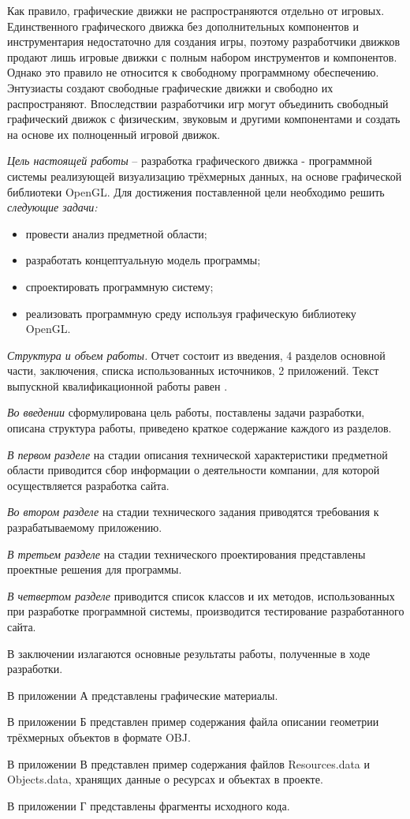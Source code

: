 Как правило, графические движки не распространяются отдельно от игровых. Единственного графического движка без дополнительных компонентов и инструментария недостаточно для создания игры, поэтому разработчики движков продают лишь игровые движки с полным набором инструментов и компонентов. Однако это правило не относится к свободному программному обеспечению. Энтузиасты создают свободные графические движки и свободно их распространяют. Впоследствии разработчики игр могут объединить свободный графический движок с физическим, звуковым и другими компонентами и создать на основе их полноценный игровой движок.

\emph{Цель настоящей работы} – разработка графического движка - программной системы реализующей визуализацию трёхмерных данных, на основе графической библиотеки OpenGL. Для достижения поставленной цели необходимо решить \emph{следующие задачи:}
\begin{itemize}
\item провести анализ предметной области;
\item разработать концептуальную модель программы;
\item спроектировать программную систему;
\item реализовать программную среду используя графическую библиотеку OpenGL.
\end{itemize}

\emph{Структура и объем работы.} Отчет состоит из введения, 4 разделов основной части, заключения, списка использованных источников, 2 приложений. Текст выпускной квалификационной работы равен .

\emph{Во введении} сформулирована цель работы, поставлены задачи разработки, описана структура работы, приведено краткое содержание каждого из разделов.

\emph{В первом разделе} на стадии описания технической характеристики предметной области приводится сбор информации о деятельности компании, для которой осуществляется разработка сайта.

\emph{Во втором разделе} на стадии технического задания приводятся требования к разрабатываемому приложению.

\emph{В третьем разделе} на стадии технического проектирования представлены проектные решения для программы.

\emph{В четвертом разделе} приводится список классов и их методов, использованных при разработке программной системы, производится тестирование разработанного сайта.

В заключении излагаются основные результаты работы, полученные в ходе разработки.

В приложении А представлены графические материалы.

В приложении Б представлен пример содержания файла описании геометрии трёхмерных объектов в формате OBJ.

В приложении В представлен пример содержания файлов Resources.data и Objects.data, хранящих данные о ресурсах и объектах в проекте.

В приложении Г представлены фрагменты исходного кода. 
